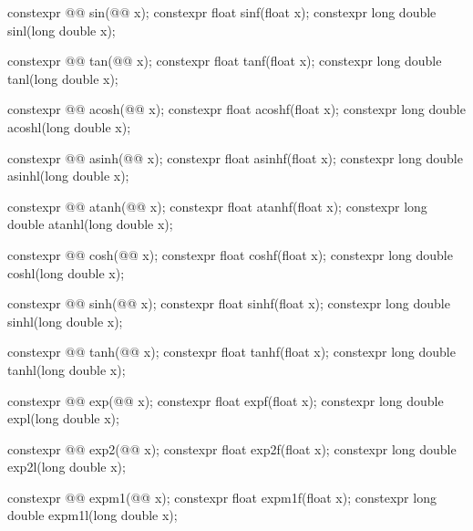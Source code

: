 \begin{codeblock}
{  constexpr @@ sin(@@ x);
  constexpr float               sinf(float x);
  constexpr long double         sinl(long double x);

  constexpr @@ tan(@@ x);
  constexpr float               tanf(float x);
  constexpr long double         tanl(long double x);

  constexpr @@ acosh(@@ x);
  constexpr float               acoshf(float x);
  constexpr long double         acoshl(long double x);

  constexpr @@ asinh(@@ x);
  constexpr float               asinhf(float x);
  constexpr long double         asinhl(long double x);

  constexpr @@ atanh(@@ x);
  constexpr float               atanhf(float x);
  constexpr long double         atanhl(long double x);

  constexpr @@ cosh(@@ x);
  constexpr float               coshf(float x);
  constexpr long double         coshl(long double x);

  constexpr @@ sinh(@@ x);
  constexpr float               sinhf(float x);
  constexpr long double         sinhl(long double x);

  constexpr @@ tanh(@@ x);
  constexpr float               tanhf(float x);
  constexpr long double         tanhl(long double x);

  constexpr @@ exp(@@ x);
  constexpr float               expf(float x);
  constexpr long double         expl(long double x);

  constexpr @@ exp2(@@ x);
  constexpr float               exp2f(float x);
  constexpr long double         exp2l(long double x);

  constexpr @@ expm1(@@ x);
  constexpr float               expm1f(float x);
  constexpr long double         expm1l(long double x);

}
\end{codeblock}
